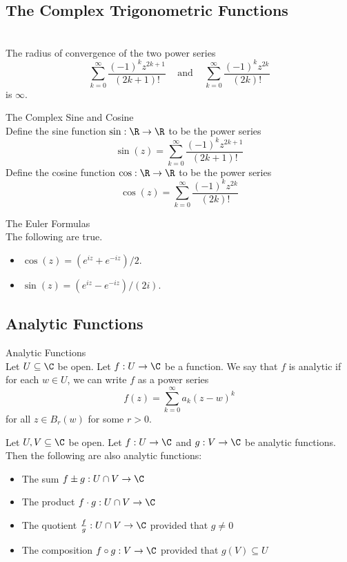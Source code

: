 \documentclass[a4paper]{article}
\begin{document}
\subsection{The Complex Trigonometric Functions}
\begin{lmm}{}{}\\
The radius of convergence of the two power series $$\sum_{k=0}^\infty\frac{(-1)^kz^{2k+1}}{(2k+1)!}\;\;\;\text{ and }\;\;\;\sum_{k=0}^\infty\frac{(-1)^kz^{2k}}{(2k)!}$$ is $\infty$. 
\end{lmm}

\begin{defn}{The Complex Sine and Cosine}{}\\
Define the sine function $\sin:\R\to\R$ to be the power series $$\sin(z)=\sum_{k=0}^\infty\frac{(-1)^kz^{2k+1}}{(2k+1)!}$$ Define the cosine function $\cos:\R\to\R$ to be the power series $$\cos(z)=\sum_{k=0}^\infty\frac{(-1)^kz^{2k}}{(2k)!}$$
\end{defn}

\begin{prp}{The Euler Formulas}{}\\
The following are true. 
\begin{itemize}
\item $\cos(z)=(e^{iz}+e^{-iz})/2$. 
\item $\sin(z)=(e^{iz}-e^{-iz})/(2i)$. 
\end{itemize}
\end{prp}

\subsection{Analytic Functions}
\begin{defn}{Analytic Functions}{}\\
Let $U\subseteq\C$ be open. Let $f:U\to\C$ be a function. We say that $f$ is analytic if for each $w\in U$, we can write $f$ as a power series $$f(z)=\sum_{k=0}^\infty a_k(z-w)^k$$ for all $z\in B_r(w)$ for some $r>0$. 
\end{defn}

\begin{prp}{}{} Let $U,V\subseteq\C$ be open. Let $f:U\to\C$ and $g:V\to\C$ be analytic functions. Then the following are also analytic functions: 
\begin{itemize}
\item The sum $f\pm g:U\cap V\to\C$
\item The product $f\cdot g:U\cap V\to\C$
\item The quotient $\frac{f}{g}:U\cap V\to\C$ provided that $g\neq 0$
\item The composition $f\circ g:V\to\C$ provided that $g(V)\subseteq U$
\end{itemize}
\end{prp}
\end{document}
